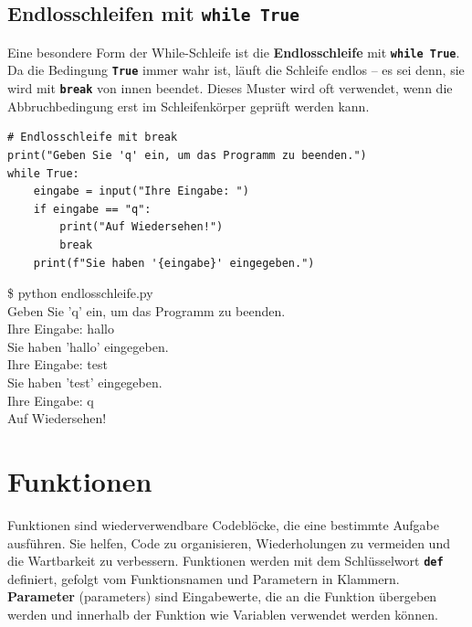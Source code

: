 \documentclass[ngerman,11pt]{article}
\begin{document}
\subsection{Endlosschleifen mit \textbf{\texttt{while True}}}

Eine besondere Form der While-Schleife ist die \textbf{Endlosschleife} mit \textbf{\texttt{while True}}. Da die Bedingung \textbf{\texttt{True}} immer wahr ist, läuft die Schleife endlos -- es sei denn, sie wird mit \textbf{\texttt{break}} von innen beendet. Dieses Muster wird oft verwendet, wenn die Abbruchbedingung erst im Schleifenkörper geprüft werden kann.

\begin{lstlisting}[caption=endlosschleife.py]
# Endlosschleife mit break
print("Geben Sie 'q' ein, um das Programm zu beenden.")
while True:
    eingabe = input("Ihre Eingabe: ")
    if eingabe == "q":
        print("Auf Wiedersehen!")
        break
    print(f"Sie haben '{eingabe}' eingegeben.")
\end{lstlisting}

\begin{tcolorbox}[colback=gray!15, fontupper=\ttfamily, boxrule=0.5pt,
    left=3mm, right=3mm, top=2mm, bottom=2mm]
\$ python endlosschleife.py\\
Geben Sie 'q' ein, um das Programm zu beenden.\\
Ihre Eingabe: hallo\\
Sie haben 'hallo' eingegeben.\\
Ihre Eingabe: test\\
Sie haben 'test' eingegeben.\\
Ihre Eingabe: q\\
Auf Wiedersehen!
\end{tcolorbox}


\section{Funktionen}

Funktionen sind wiederverwendbare Codeblöcke, die eine bestimmte Aufgabe ausführen. Sie helfen, Code zu organisieren, Wiederholungen zu vermeiden und die Wartbarkeit zu verbessern. Funktionen werden mit dem Schlüsselwort \textbf{\texttt{def}} definiert, gefolgt vom Funktionsnamen und Parametern in Klammern. \textbf{Parameter} (parameters) sind Eingabewerte, die an die Funktion übergeben werden und innerhalb der Funktion wie Variablen verwendet werden können.
\end{document}

